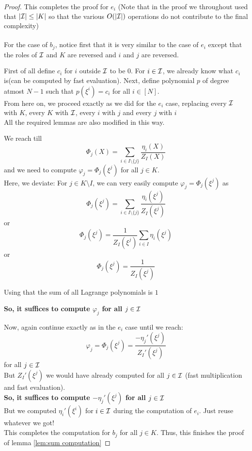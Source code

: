 \begin{proof}
    This completes the proof for $e_i$ (Note that in the proof we throughout used that $|\mathcal{I}| \leq |K|$ so that the various $O(|\mathcal{I}|)$ operations do not contribute to the final complexity) \\\\

    For the case of $b_j$, notice first that it is very similar to the case of $e_i$ except that the roles of $\mathcal{I}$ and $K$ are reversed and $i$ and $j$ are reversed.

    First of all define $c_i$ for $i$ outside $\mathcal{I}$ to be 0. For $i \in \mathcal{I}$, we already know what $c_i$ is(can be computed by fast evaluation).
    Next, define polynomial $p$ of degree atmost $N-1$ such that $p(\xi^i)=c_i$ for all $i \in [N]$.\\

    From here on, we proceed exactly as we did for the $e_i$ case, replacing every $\mathcal{I}$ with $K$, every $K$ with $\mathcal{I}$, every $i$ with $j$ and every $j$ with $i$\\

    All the required lemmas are also modified in this way.

    We reach till
    $$\Phi_j(X)=\sum_{i\in I\setminus \{j\}} \frac{\eta_i(X)}{Z_I(X)}$$
    and we need to compute $\varphi_j=\Phi_j(\xi^j)$ for all $j \in K$.\\

    Here, we deviate: For $j \in K\setminus I$, we can very easily compute $\varphi_j=\Phi_j(\xi^j)$ as
    $$\Phi_j(\xi^j)=\sum_{i\in I\setminus \{j\}} \frac{\eta_i(\xi^j)}{Z_I(\xi^j)}$$
    or
    $$\Phi_j(\xi^j)=\frac{1}{Z_I(\xi^j)} \sum_{i\in I}\eta_i(\xi^j)$$
    or
    $$\Phi_j(\xi^j)=\frac{1}{Z_I(\xi^j)}$$

    Using that the sum of all Lagrange polynomials is $1$

    \textbf{So, it suffices to compute $\varphi_j$ for all $j \in \mathcal{I}$}

    Now, again continue exactly as in the $e_i$ case until we reach:
    $$\varphi_j =\Phi_j(\xi^j) = \frac{-\eta_j'(\xi^j)}{Z_I'(\xi^j)}$$
    for all $j \in \mathcal{I}$\\

    But $Z_I'(\xi^j)$ we would have already computed for all $j \in \mathcal{I}$ (fast multiplication and fast evaluation). \\

    \textbf{So, it suffices to compute $-\eta_j'(\xi^j)$ for all $j \in \mathcal{I}$\\}
    But we computed $\eta_i'(\xi^i)$ for $i\in \mathcal{I}$ during the computation of $e_i$. Just reuse whatever we got!\\

    This completes the computation for $b_j$ for all $j \in K$.
    Thus, this finishes the proof of lemma \ref{lem:sum computation}
\end{proof}

